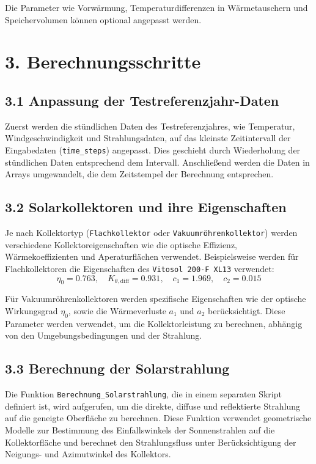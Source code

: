 \documentclass{article}
\begin{document}
Die Parameter wie Vorwärmung, Temperaturdifferenzen in Wärmetauschern und Speichervolumen können optional angepasst werden.

\section*{3. Berechnungsschritte}

\subsection*{3.1 Anpassung der Testreferenzjahr-Daten}

Zuerst werden die stündlichen Daten des Testreferenzjahres, wie Temperatur, Windgeschwindigkeit und Strahlungsdaten, auf das kleinste Zeitintervall der Eingabedaten (\texttt{time\_steps}) angepasst. Dies geschieht durch Wiederholung der stündlichen Daten entsprechend dem Intervall. Anschließend werden die Daten in Arrays umgewandelt, die dem Zeitstempel der Berechnung entsprechen.

\subsection*{3.2 Solarkollektoren und ihre Eigenschaften}

Je nach Kollektortyp (\texttt{Flachkollektor} oder \texttt{Vakuumröhrenkollektor}) werden verschiedene Kollektoreigenschaften wie die optische Effizienz, Wärmekoeffizienten und Aperaturflächen verwendet. Beispielsweise werden für Flachkollektoren die Eigenschaften des \texttt{Vitosol 200-F XL13} verwendet:
\[
\eta_0 = 0.763, \quad K_{\theta,\text{diff}} = 0.931, \quad c_1 = 1.969, \quad c_2 = 0.015
\]

Für Vakuumröhrenkollektoren werden spezifische Eigenschaften wie der optische Wirkungsgrad \( \eta_0 \), sowie die Wärmeverluste \( a_1 \) und \( a_2 \) berücksichtigt. Diese Parameter werden verwendet, um die Kollektorleistung zu berechnen, abhängig von den Umgebungsbedingungen und der Strahlung.

\subsection*{3.3 Berechnung der Solarstrahlung}

Die Funktion \texttt{Berechnung\_Solarstrahlung}, die in einem separaten Skript definiert ist, wird aufgerufen, um die direkte, diffuse und reflektierte Strahlung auf die geneigte Oberfläche zu berechnen. Diese Funktion verwendet geometrische Modelle zur Bestimmung des Einfallswinkels der Sonnenstrahlen auf die Kollektorfläche und berechnet den Strahlungsfluss unter Berücksichtigung der Neigungs- und Azimutwinkel des Kollektors.
\end{document}
